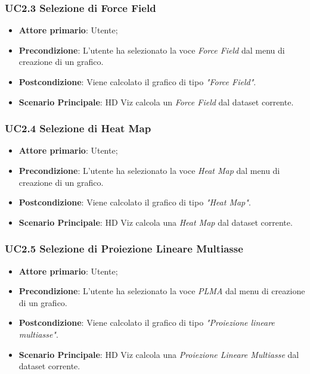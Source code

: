 \subsubsection{UC2.3 Selezione di Force Field}
\label{ssub:UC2.3}
\begin{itemize}

    \item \textbf{Attore primario}: Utente;

    \item \textbf{Precondizione}:   L'utente ha selezionato la voce \emph{Force Field} dal menu di creazione di un grafico.

    \item \textbf{Postcondizione}:  Viene calcolato il grafico di tipo \emph{"Force Field"}.
	
	\item \textbf{Scenario Principale}: HD Viz calcola un \emph{Force Field} dal dataset corrente.

\end{itemize}


\subsubsection{UC2.4 Selezione di Heat Map}
\label{ssub:UC2.4}
\begin{itemize}

    \item \textbf{Attore primario}: Utente;

	\item \textbf{Precondizione}:   L'utente ha selezionato la voce \emph{Heat Map} dal menu di creazione di un grafico.

    \item \textbf{Postcondizione}:  Viene calcolato il grafico di tipo \emph{"Heat Map"}.

	\item \textbf{Scenario Principale}: HD Viz calcola una \emph{Heat Map} dal dataset corrente.

\end{itemize}


\subsubsection{UC2.5 Selezione di Proiezione Lineare Multiasse}
\label{ssub:UC2.5}
\begin{itemize}

    \item \textbf{Attore primario}: Utente;

    \item \textbf{Precondizione}:   L'utente ha selezionato la voce \emph{PLMA} dal menu di creazione di un grafico.

    \item \textbf{Postcondizione}:  Viene calcolato il grafico di tipo \emph{"Proiezione lineare multiasse"}.

	\item \textbf{Scenario Principale}: HD Viz calcola una \emph{Proiezione Lineare Multiasse} dal dataset corrente.
\end{itemize}

